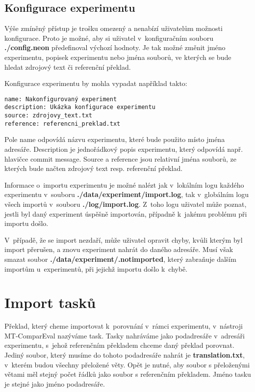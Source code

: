 \subsection{Konfigurace experimentu}
Výše zmíněný přístup je trošku omezený a nenabízí uživatelům možnosti konfigurace.
Proto je možné,
  aby si uživatel v~konfiguračním souboru \textbf{./config.neon} předefinoval výchozí hodnoty.
Je tak možné změnit jméno experimentu, popisek experimentu nebo jména souborů,
  ve kterých se bude hledat zdrojový text či referenční překlad.

Konfigurace experimentu by mohla vypadat například takto: \\

\begin{verbatim}
name: Nakonfigurovaný experiment
description: Ukázka konfigurace experimentu
source: zdrojovy_text.txt
reference: referencni_preklad.txt
\end{verbatim}

Pole name odpovídá názvu experimentu, které bude použito místo jména adresáře.
Description je jednořádkový popis experimentu,
  který odpovídá např. hlavičce commit message.
Source a reference jsou relativní jména souborů,
  ze kterých bude načten zdrojový text resp. referenční překlad.

Informace o~importu experimentu je možné nalézt
  jak v~lokálním logu každého experimentu v~souboru \textbf{./data/experiment/import.log},
  tak v~globálním logu všech importů v~souboru \textbf{./log/import.log}.
Z~toho logu uživatel může poznat,
  jestli byl daný experiment úspěšně importován,
  případně k~jakému problému při importu došlo.

V~případě, že se import nezdaří,
  může uživatel opravit chyby,
  kvůli kterým byl import přerušen,
  a znovu experiment nahrát do daného adresáře.
Musí však smazat soubor \textbf{./data/experiment/.notimported},
  který zabraňuje dalším importům u~experimentů,
  při jejichž importu došlo k~chybě.


\section{Import tasků}
Překlad,
  který cheme importovat k~porovnání v~rámci experimentu,
  v~nástroji MT-ComparEval nazýváme task.
Tasky nahráváme jako podadresáře v~adresáři experimentu,
  s~jehož referenčním překladem chceme daný překlad porovnat.
Jediný soubor, který musíme do tohoto podadresáře nahrát je \textbf{translation.txt},
  v~kterém budou všechny přeložené věty.
Opět je nutné, aby soubor s přeloženými větami měl stejný počet řádků jako soubor s referenčním překladem.
Jméno tasku je stejné jako jméno podadresáře.


